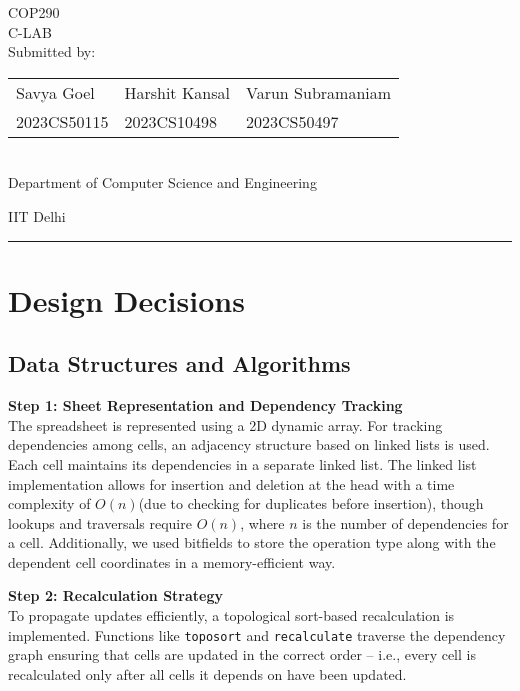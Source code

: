 \documentclass[12pt,letterpaper,onecolumn]{exam}
\begin{document}
\begingroup
    \centering
    \LARGE COP290\\
    \LARGE C-LAB\\[1em]
    \large Submitted by:\\[0.8em]
    \begin{tabular}{>{\centering\arraybackslash}m{4cm} >{\centering\arraybackslash}m{4cm} >{\centering\arraybackslash}m{5cm}}
        Savya Goel & Harshit Kansal & Varun Subramaniam \\
        2023CS50115 & 2023CS10498 & 2023CS50497
    \end{tabular}\\[1em]
    \large Department of Computer Science and Engineering\par
    \large IIT Delhi\par
\endgroup

\rule{\textwidth}{0.4pt}

\section{Design Decisions}

\subsection{Data Structures and Algorithms}

\noindent \textbf{Step 1: Sheet Representation and Dependency Tracking}\\
The spreadsheet is represented using a 2D dynamic array. For tracking dependencies among cells, an adjacency structure based on linked lists is used. Each cell maintains its dependencies in a separate linked list. The linked list implementation allows for insertion and deletion at the head with a time complexity of \(O(n)\)(due to checking for duplicates before insertion), though lookups and traversals require \(O(n)\), where \(n\) is the number of dependencies for a cell. Additionally, we used bitfields to store the operation type along with the dependent cell coordinates in a memory-efficient way.

\vspace{0.3cm}

\noindent \textbf{Step 2: Recalculation Strategy}\\
To propagate updates efficiently, a topological sort-based recalculation is implemented. Functions like \texttt{toposort} and \texttt{recalculate} traverse the dependency graph ensuring that cells are updated in the correct order -- i.e., every cell is recalculated only after all cells it depends on have been updated. 
\end{document}
